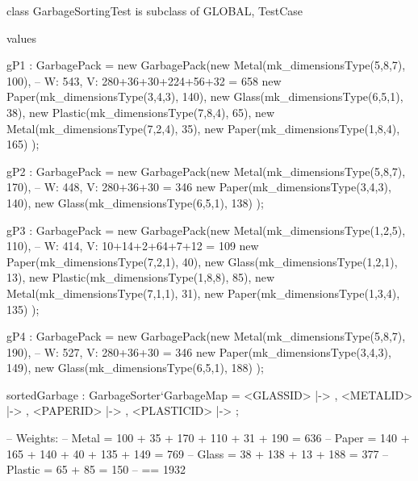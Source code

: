 \begin{vdmpp}[breaklines=true]
class GarbageSortingTest is subclass of GLOBAL, TestCase

values

gP1 : GarbagePack = new GarbagePack({new Metal(mk_dimensionsType(5,8,7), 100), -- W: 543, V: 280+36+30+224+56+32 = 658
                                     new Paper(mk_dimensionsType(3,4,3), 140),
                                     new Glass(mk_dimensionsType(6,5,1), 38),
                                     new Plastic(mk_dimensionsType(7,8,4), 65),
                                     new Metal(mk_dimensionsType(7,2,4), 35),
                                     new Paper(mk_dimensionsType(1,8,4), 165)
                                     });

gP2 : GarbagePack = new GarbagePack({new Metal(mk_dimensionsType(5,8,7), 170), -- W: 448, V: 280+36+30 = 346
                                     new Paper(mk_dimensionsType(3,4,3), 140),
                                     new Glass(mk_dimensionsType(6,5,1), 138)
                                     });

gP3 : GarbagePack = new GarbagePack({new Metal(mk_dimensionsType(1,2,5), 110), -- W: 414, V: 10+14+2+64+7+12 = 109
                                     new Paper(mk_dimensionsType(7,2,1), 40),
                                     new Glass(mk_dimensionsType(1,2,1), 13),
                                     new Plastic(mk_dimensionsType(1,8,8), 85),
                                     new Metal(mk_dimensionsType(7,1,1), 31),
                                     new Paper(mk_dimensionsType(1,3,4), 135)
                                     });

gP4 : GarbagePack = new GarbagePack({new Metal(mk_dimensionsType(5,8,7), 190), -- W: 527, V: 280+36+30 = 346
                                     new Paper(mk_dimensionsType(3,4,3), 149),
                                     new Glass(mk_dimensionsType(6,5,1), 188)
                                     });

sortedGarbage : GarbageSorter`GarbageMap = {   <GLASSID>   |-> {},
                                                <METALID>   |-> {},
                                                <PAPERID>   |-> {},
                                                <PLASTICID> |-> {}
                                            };

-- Weights:
-- Metal = 100 + 35 + 170 + 110 + 31 + 190 = 636
-- Paper = 140 + 165 + 140 + 40 + 135 + 149 = 769
-- Glass = 38 + 138 + 13 + 188 = 377
-- Plastic = 65 + 85 = 150
-- == 1932


\end{vdmpp}
